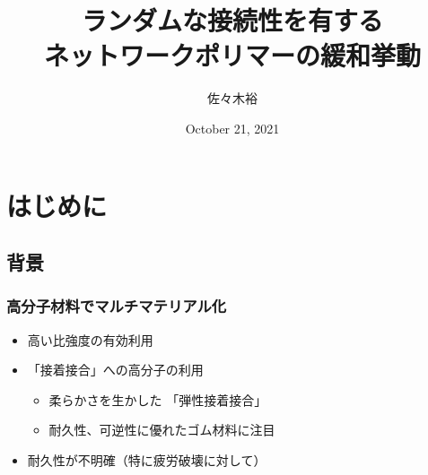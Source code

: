 \documentclass[12pt, dvipdfmx]{beamer}
\title
[ランダムな接続性を有するネットワークポリマーの緩和挙動]
{ランダムな接続性を有する\\ネットワークポリマーの緩和挙動}
\author[東亞合成　佐々木]{佐々木裕}
\institute[東亞合成]{東亞合成}
\date{October 21, 2021}
\begin{document}
\begin{frame}\frametitle{}
	\titlepage
\end{frame}

\section{はじめに}
\subsection{背景}

\begin{frame}
	\frametitle{高分子材料でマルチマテリアル化}
        \begin{itemize}
            \item \alert{高い比強度}の有効利用
            \item {\color{red} 「接着接合」}への高分子の利用
                \begin{itemize}
                    \item 柔らかさを生かした{\color{red} 「弾性接着接合」}
                    \item 耐久性、可逆性に優れた\alert{ゴム材料に注目}
                \end{itemize}
            \item {\color{blue}耐久性が不明確（特に疲労破壊に対して）}
        \end{itemize}
\end{frame}
\end{document}
